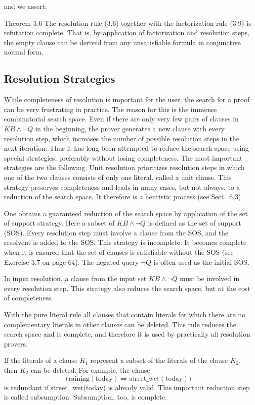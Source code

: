 \documentclass[10pt]{book}
\begin{document}
and we assert:

Theorem 3.6 The resolution rule (3.6) together with the factorization rule (3.9) is refutation complete. That is, by application of factorization and resolution steps, the empty clause can be derived from any unsatisfiable formula in conjunctive normal form.

\subsection{Resolution Strategies}
While completeness of resolution is important for the user, the search for a proof can be very frustrating in practice. The reason for this is the immense combinatorial search space. Even if there are only very few pairs of clauses in $K B \wedge \neg Q$ in the beginning, the prover generates a new clause with every resolution step, which increases the number of possible resolution steps in the next iteration. Thus it has long been attempted to reduce the search space using special strategies, preferably without losing completeness. The most important strategies are the following.
Unit resolution prioritizes resolution steps in which one of the two clauses consists of only one literal, called a unit clause. This strategy preserves completeness and leads in many cases, but not always, to a reduction of the search space. It therefore is a heuristic process (see Sect.~6.3).

One obtains a guaranteed reduction of the search space by application of the set of support strategy. Here a subset of $KB \wedge \neg Q$ is defined as the set of support (SOS). Every resolution step must involve a clause from the SOS, and the resolvent is added to the SOS. This strategy is incomplete. It becomes complete when it is ensured that the set of clauses is satisfiable without the SOS (see Exercise 3.7 on page 64). The negated query $\neg Q$ is often used as the initial SOS.

In input resolution, a clause from the input set $KB \wedge \neg Q$ must be involved in every resolution step. This strategy also reduces the search space, but at the cost of completeness.

With the pure literal rule all clauses that contain literals for which there are no complementary literals in other clauses can be deleted. This rule reduces the search space and is complete, and therefore it is used by practically all resolution provers.

If the literals of a clause $K_{1}$ represent a subset of the literals of the clause $K_{2}$, then $K_{2}$ can be deleted. For example, the clause
$$
\bigl(\text{raining}(\text{today}) \Rightarrow \text{street\_wet}(\text{today})\bigr)
$$
is redundant if street\_wet(today) is already valid. This important reduction step is called subsumption. Subsumption, too, is complete.
\end{document}
